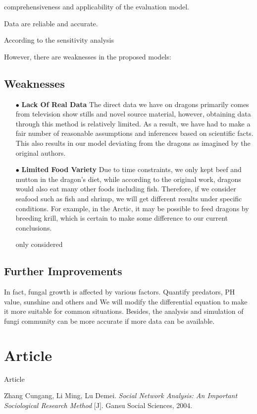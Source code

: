 \documentclass[12pt]{article}  %
\begin{document}
 comprehensiveness and applicability of the evaluation
model.

Data are reliable and accurate.

According to the sensitivity analysis

However, there are weaknesses in the proposed models:

\subsection{Weaknesses}
\vspace{-0.3cm}
\begin{itemize}

\item[$\bullet$] \textbf{Lack Of Real Data }The direct data we have on dragons primarily comes from television show stills and novel source material, however, obtaining data through this method is relatively limited. As a result, we have had to make a fair number of reasonable assumptions and inferences based on scientific facts. This also results in our model deviating from the dragons as imagined by the original authors.

\item[$\bullet$] \textbf{Limited Food Variety }Due to time constraints, we only kept beef and mutton in the dragon's diet, while according to the original work, dragons would also eat many other foods including fish. Therefore, if we consider seafood such as fish and shrimp, we will get different results under specific conditions. For example, in the Arctic, it may be possible to feed dragons by breeding krill, which is certain to make some difference to our current conclusions.



only considered


\end{itemize}
\subsection{Further Improvements}
\vspace{-0.3cm}

In fact, fungal growth is affected by various factors. Quantify predators, PH value,
sunshine and others and We will modify the differential equation to make it more
suitable for common situations. Besides, the analysis and simulation of fungi community can be more accurate if more data can be available. 
\newpage
\section{Article}
\newpage
Article
\newpage
\begin{thebibliography}{99}
	\vspace{-0.5cm}
	 Zhang Cungang, Li Ming, Lu Demei. \emph{Social Network Analysis: An Important Sociological Research Method} [J]. Gansu Social Sciences, 2004. 
\end{thebibliography}
\end{document}
